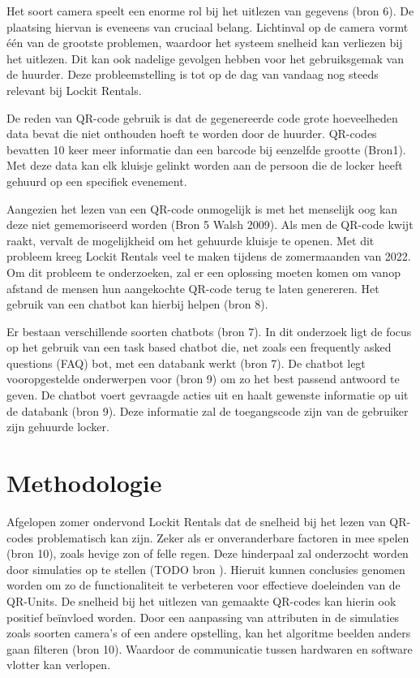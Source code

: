\documentclass{hogent-article}
\begin{document}
Het soort camera speelt een enorme rol bij het uitlezen van gegevens (bron 6). De plaatsing hiervan is eveneens van cruciaal belang. Lichtinval op de camera vormt één van de grootste problemen, waardoor het systeem snelheid kan verliezen bij het uitlezen. Dit kan ook nadelige gevolgen hebben voor het gebruiksgemak van de huurder. Deze probleemstelling is tot op de dag van vandaag nog steeds relevant bij Lockit Rentals.

De reden van QR-code gebruik is dat de gegenereerde code grote hoeveelheden data bevat die niet onthouden hoeft te worden door de huurder. QR-codes bevatten 10 keer meer informatie dan een barcode bij eenzelfde grootte (Bron1). Met deze data kan elk kluisje gelinkt worden aan de persoon die de locker heeft gehuurd op een specifiek evenement.

Aangezien het lezen van een QR-code onmogelijk is met het menselijk oog kan deze niet gememoriseerd worden (Bron 5 Walsh 2009). Als men de QR-code kwijt raakt, vervalt de mogelijkheid om het gehuurde kluisje te openen. Met dit probleem kreeg Lockit Rentals veel te maken tijdens de zomermaanden van 2022. Om dit probleem te onderzoeken, zal er een oplossing moeten komen om vanop afstand de mensen hun aangekochte QR-code terug te laten genereren. Het gebruik van een chatbot kan hierbij helpen (bron 8). 

Er bestaan verschillende soorten chatbots (bron 7). In dit onderzoek ligt de focus op het gebruik van een task based chatbot die, net zoals een frequently asked questions (FAQ) bot, met een databank werkt (bron 7). De chatbot legt vooropgestelde onderwerpen voor (bron 9) om zo het best passend antwoord te geven. De chatbot voert gevraagde acties uit en haalt gewenste informatie op uit de databank (bron 9). Deze informatie zal de toegangscode zijn van de gebruiker zijn gehuurde locker.


\section{Methodologie}%
\label{sec:methodologie}

Afgelopen zomer ondervond Lockit Rentals dat de snelheid bij het lezen van QR-codes problematisch kan zijn. Zeker als er onveranderbare factoren in mee spelen (bron 10), zoals hevige zon of felle regen. 
Deze hinderpaal zal onderzocht worden door simulaties op te stellen (TODO bron ). Hieruit kunnen conclusies genomen worden om zo de functionaliteit te verbeteren voor effectieve doeleinden van de QR-Units. De snelheid bij het uitlezen van gemaakte QR-codes kan hierin ook positief beïnvloed worden. Door een aanpassing van attributen in de simulaties zoals soorten camera’s of een andere opstelling, kan het algoritme beelden anders gaan filteren (bron 10). Waardoor de communicatie tussen hardwaren en software vlotter kan verlopen.
\end{document}
